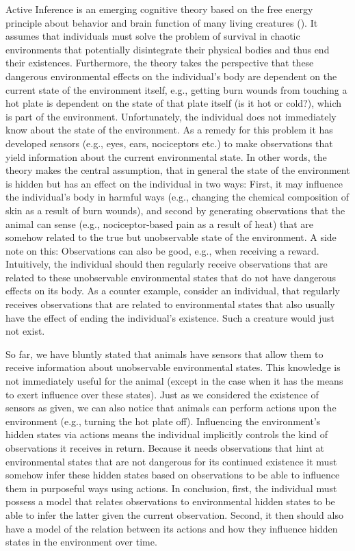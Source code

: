 Active Inference is an emerging cognitive theory based on the free energy principle about behavior and brain function of many living creatures (\cite{friston2010aif}). It assumes that individuals must solve the problem of survival in chaotic environments that potentially disintegrate their physical bodies and thus end their existences. Furthermore, the theory takes the perspective that these dangerous environmental effects on the individual's body are dependent on the current state of the environment itself, e.g., getting burn wounds from touching a hot plate is dependent on the state of that plate itself (is it hot or cold?), which is part of the environment. Unfortunately, the individual does not immediately know about the state of the environment. As a remedy for this problem it has developed sensors (e.g., eyes, ears, nociceptors etc.) to make observations that yield information about the current environmental state. In other words, the theory makes the central assumption, that in general the state of the environment is hidden but has an effect on the individual in two ways: First, it may influence the individual's body in harmful ways (e.g., changing the chemical composition of skin as a result of burn wounds), and second by generating observations that the animal can sense (e.g., nociceptor-based pain as a result of heat) that are somehow related to the true but unobservable state of the environment. A side note on this: Observations can also be good, e.g., when receiving a reward. Intuitively, the individual should then regularly receive observations that are related to these unobservable environmental states that do not have dangerous effects on its body. As a counter example, consider an individual, that regularly receives observations that are related to environmental states that also usually have the effect of ending the individual's existence. Such a creature would just not exist.

So far, we have bluntly stated that animals have sensors that allow them to receive information about unobservable environmental states. This knowledge is not immediately useful for the animal (except in the case when it has the means to exert influence over these states). Just as we considered the existence of sensors as given, we can also notice that animals can perform actions upon the environment (e.g., turning the hot plate off). Influencing the environment's hidden states via actions means the individual implicitly controls the kind of observations it receives in return. Because it needs observations that hint at environmental states that are not dangerous for its continued existence it must somehow infer these hidden states based on observations to be able to influence them in purposeful ways using actions. In conclusion, first, the individual must possess a model that relates observations to environmental hidden states to be able to infer the latter given the current observation. Second, it then should also have a model of the relation between its actions and how they influence hidden states in the environment over time.

